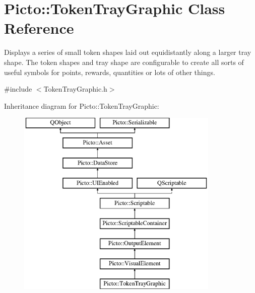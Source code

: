 \hypertarget{class_picto_1_1_token_tray_graphic}{\section{Picto\-:\-:Token\-Tray\-Graphic Class Reference}
\label{class_picto_1_1_token_tray_graphic}
}


Displays a series of small token shapes laid out equidistantly along a larger tray shape. The token shapes and tray shape are configurable to create all sorts of useful symbols for points, rewards, quantities or lots of other things.  




{\ttfamily \#include $<$Token\-Tray\-Graphic.\-h$>$}

Inheritance diagram for Picto\-:\-:Token\-Tray\-Graphic\-:\begin{figure}[H]
\begin{center}
\leavevmode
\includegraphics[height=9.000000cm]{class_picto_1_1_token_tray_graphic}
\end{center}
\end{figure}
